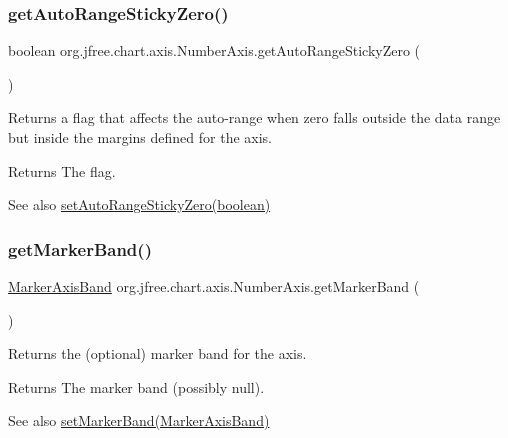 \subsubsection{\texorpdfstring{get\+Auto\+Range\+Sticky\+Zero()}{getAutoRangeStickyZero()}}
{\footnotesize\ttfamily boolean org.\+jfree.\+chart.\+axis.\+Number\+Axis.\+get\+Auto\+Range\+Sticky\+Zero (\begin{DoxyParamCaption}{ }\end{DoxyParamCaption})}

Returns a flag that affects the auto-\/range when zero falls outside the data range but inside the margins defined for the axis.

\begin{DoxyReturn}{Returns}
The flag.
\end{DoxyReturn}
\begin{DoxySeeAlso}{See also}
\mbox{\hyperlink{classorg_1_1jfree_1_1chart_1_1axis_1_1_number_axis_a1967bd80607d8499457992833745789f}{set\+Auto\+Range\+Sticky\+Zero(boolean)}} 
\end{DoxySeeAlso}
\mbox{\label{classorg_1_1jfree_1_1chart_1_1axis_1_1_number_axis_a5a439c05a6192b3760772f680d307bd9}} 
\subsubsection{\texorpdfstring{get\+Marker\+Band()}{getMarkerBand()}}
{\footnotesize\ttfamily \mbox{\hyperlink{classorg_1_1jfree_1_1chart_1_1axis_1_1_marker_axis_band}{Marker\+Axis\+Band}} org.\+jfree.\+chart.\+axis.\+Number\+Axis.\+get\+Marker\+Band (\begin{DoxyParamCaption}{ }\end{DoxyParamCaption})}

Returns the (optional) marker band for the axis.

\begin{DoxyReturn}{Returns}
The marker band (possibly {\ttfamily null}).
\end{DoxyReturn}
\begin{DoxySeeAlso}{See also}
\mbox{\hyperlink{classorg_1_1jfree_1_1chart_1_1axis_1_1_number_axis_a5ce1751ba25aa3c1860c63d3c10603a9}{set\+Marker\+Band(\+Marker\+Axis\+Band)}} 
\end{DoxySeeAlso}
\mbox{\label{classorg_1_1jfree_1_1chart_1_1axis_1_1_number_axis_a0a7a84fa0f916b12d3f1605f6e6ea394}} 
